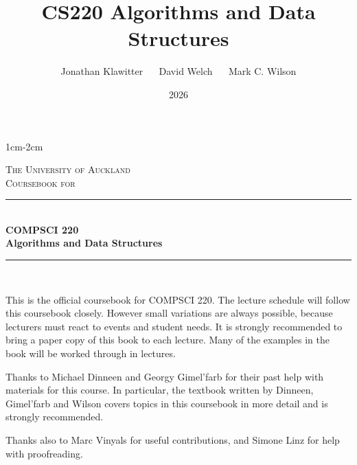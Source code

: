\documentclass[11pt,twoside,openany]{memoir}
\theoremstyle{definition}
\numberwithin{Lemma}{chapter}
\numberwithin{Exercise}{section}
\begin{document}
\title{CS220 Algorithms and Data Structures}
\author{Jonathan Klawitter $\quad$ David Welch $\quad$ Mark C. Wilson}
\date{2026}

\begin{titlingpage}
	\newcommand{\HRule}{\rule{\linewidth}{0.5mm}}
	\setlength{\droptitle}{30pt} 
	\begin{adjustwidth*}{1cm}{-2cm}
	\centering
	
	
	\vspace*{0.4cm}
	\textsc{\LARGE The University of Auckland}\\[3cm]
	
	\textsc{\Large Coursebook for}\\[0.4cm]
	
	\HRule\\[0.5cm]
	\Huge{\bfseries COMPSCI 220\\ 
	Algorithms and Data Structures}\\[0.1cm]
	\HRule\\[0.5cm]
	\Large{\thedate}
	
	\vspace*{2.4cm}
	\LARGE{\theauthor}
	
	\end{adjustwidth*}
	
\end{titlingpage}


\setcounter{page}{1}

\thispagestyle{empty}
This is the official coursebook for COMPSCI 220. The lecture schedule will follow this coursebook closely. 
However small variations are always possible, because lecturers must react to events and student needs. 
It is strongly recommended to bring a paper copy of this book to each lecture. Many of the examples in the book will be worked through in lectures.

Thanks to Michael Dinneen and Georgy Gimel'farb for their past help with materials for this course. 
In particular, the textbook written by Dinneen, Gimel'farb and Wilson covers topics in this coursebook in more detail and is strongly recommended.

Thanks also to Marc Vinyals for useful contributions, and Simone Linz for help with proofreading.

\vfill
\doclicenseThis

\clearpage
\setcounter{tocdepth}{0}
\tableofcontents*

\pagestyle{220coursebook}

 






\end{document}
